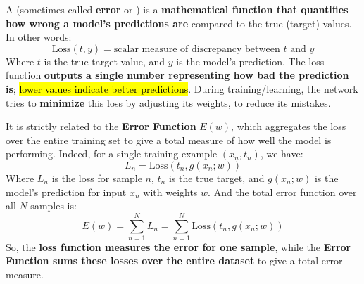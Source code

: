 \begin{definitionbox}\label{def:loss-function}
    A  (sometimes called \textbf{error} or ) is a \textbf{mathematical function that quantifies how wrong a model's predictions are} compared to the true (target) values. In other words:
    \begin{equation}
        \text{Loss}(t, y) = \text{scalar measure of discrepancy between } t \text{ and } y
    \end{equation}
    Where $t$ is the true target value, and $y$ is the model's prediction. The loss function \textbf{outputs a single number representing how bad the prediction is}; \hl{lower values indicate better predictions}. During training/learning, the network tries to \textbf{minimize} this loss by adjusting its weights, to reduce its mistakes.

    \highspace
    It is strictly related to the \textbf{Error Function} $E(w)$, which aggregates the loss over the entire training set to give a total measure of how well the model is performing. Indeed, for a single training example $\left(x_{n}, t_{n}\right)$, we have:
    \begin{equation}
        L_{n} = \text{Loss}\left(t_{n}, g\left(x_{n}; w\right)\right)
    \end{equation}
    Where $L_{n}$ is the loss for sample $n$, $t_{n}$ is the true target, and $g\left(x_{n}; w\right)$ is the model's prediction for input $x_{n}$ with weights $w$. And the total error function over all $N$ samples is:
    \begin{equation*}
        E(w) = \displaystyle\sum_{n=1}^{N} L_{n} = \displaystyle\sum_{n=1}^{N} \text{Loss}\left(t_{n}, g\left(x_{n}; w\right)\right)
    \end{equation*}
    So, the \textbf{loss function measures the error for one sample}, while the \textbf{Error Function sums these losses over the entire dataset} to give a total error measure.
\end{definitionbox}

